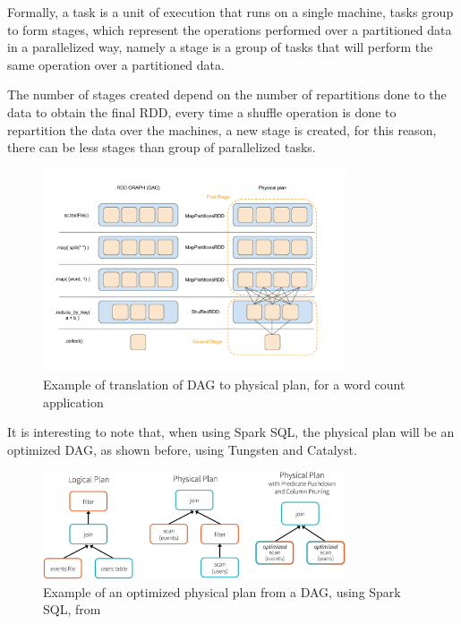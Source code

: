 \documentclass[11pt]{book} %
\begin{document}
          Formally, a task is a unit of execution that runs on a single machine, tasks group to form stages, which represent the operations performed over a partitioned data in a parallelized way, namely a stage is a group of tasks that will perform the same operation over a partitioned data.

          The number of stages created depend on the number of repartitions done to the data to obtain the final RDD, every time a shuffle operation is done to repartition the data over the machines, a new stage is created, for this reason, there can be less stages than group of parallelized tasks.

          \begin{figure}[!ht]
            \centering
            \includegraphics[width=0.8\textwidth]{DAG_to_phisical_plan.png}
            \caption{Example of translation of DAG to physical plan, for a word count application}
            \label{img:DAG_to_physical}
          \end{figure}

          It is interesting to note that, when using Spark SQL, the physical plan will be an optimized DAG, as shown before, using Tungsten and Catalyst.

          \begin{figure}[!ht]
            \centering
            \includegraphics[width=0.8\textwidth]{spark_logical_to_phisical_plan.jpg}
            \caption{Example of an optimized physical plan from a DAG, using Spark SQL, from \cite{optimized_dag_to_physical}}
          \end{figure}
\end{document}
